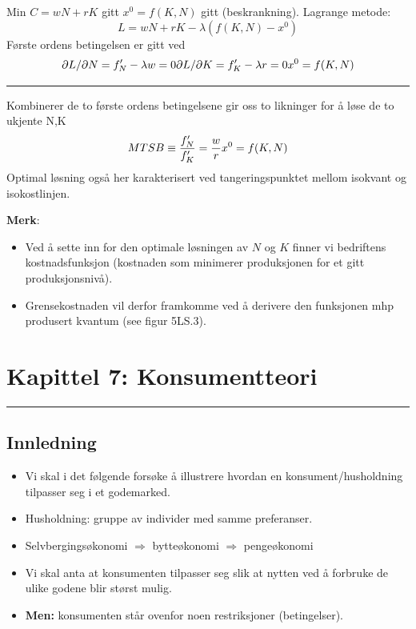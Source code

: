 \documentclass[
  letterpaper,
  DIV=11,
  numbers=noendperiod]{scrartcl}
\providecommand{\tightlist}{%
  \setlength{\itemsep}{0pt}\setlength{\parskip}{0pt}}\usepackage{longtable,booktabs,array}
\begin{document}
Min \(C=wN +rK\) gitt \(x^0=f(K,N)\) gitt (beskrankning). Lagrange
metode: \begin{equation}
L =wN +rK - \lambda(f(K,N)-x^0)
\end{equation} Første ordens betingelsen er gitt ved \begin{equation}
\partial L/\partial N = f'_{N} - \lambda w  =0 \\ 
\partial L/\partial K = f'_{K} - \lambda r =0 \\
x^0=f(K,N)
\end{equation}

\begin{center}\rule{0.5\linewidth}{0.5pt}\end{center}

Kombinerer de to første ordens betingelsene gir oss to likninger for å
løse de to ukjente N,K \begin{equation}
MTSB \equiv  \frac{f'_{N}}{f'_{K}} = \frac{w}{r} \\
x^0=f(K,N)
\end{equation} Optimal løsning også her karakterisert ved
tangeringspunktet mellom isokvant og isokostlinjen.

\textbf{Merk}:

\begin{itemize}
\tightlist
\item
  Ved å sette inn for den optimale løsningen av \(N\) og \(K\) finner vi
  bedriftens kostnadsfunksjon (kostnaden som minimerer produksjonen for
  et gitt produksjonsnivå).
\item
  Grensekostnaden vil derfor framkomme ved å derivere den funksjonen mhp
  produsert kvantum (see figur 5LS.3).
\end{itemize}

\section{Kapittel 7: Konsumentteori}\label{kapittel-7-konsumentteori}

\begin{center}\rule{0.5\linewidth}{0.5pt}\end{center}

\subsection{Innledning}\label{innledning-1}

\begin{itemize}
\tightlist
\item
  Vi skal i det følgende forsøke å illustrere hvordan en
  konsument/husholdning tilpasser seg i et godemarked.
\item
  Husholdning: gruppe av individer med samme preferanser.
\item
  Selvbergingsøkonomi \(\Rightarrow\) bytteøkonomi \(\Rightarrow\)
  pengeøkonomi
\item
  Vi skal anta at konsumenten tilpasser seg slik at nytten ved å
  forbruke de ulike godene blir størst mulig.
\item
  \textbf{Men:} konsumenten står ovenfor noen restriksjoner
  (betingelser).
\end{itemize}
\end{document}
